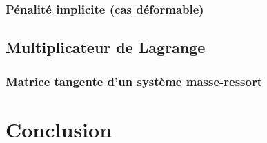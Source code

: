\documentclass[a4paper,11pt]{article}
\begin{document}
\subsubsection{Pénalité implicite (cas déformable)}

\subsection{Multiplicateur de Lagrange}
\subsubsection{Matrice tangente d'un système masse-ressort}

\section{Conclusion}
\end{document}
